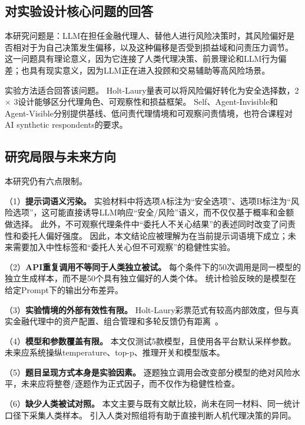 \subsection{对实验设计核心问题的回答}

本研究问题是：LLM在担任金融代理人、替他人进行风险决策时，其风险偏好是否相对于为自己决策发生偏移，以及这种偏移是否受到损益域和问责压力调节。
这一问题具有理论意义，因为它连接了人类代理决策、前景理论和LLM行为偏差；也具有现实意义，因为LLM正在进入投顾和交易辅助等高风险场景。

实验方法适合回答该问题。
Holt-Laury量表可以将风险偏好转化为安全选择数，2 $\times$ 3设计能够区分代理角色、可观察性和损益框架。
Self、Agent-Invisible和Agent-Visible分别提供基线、低问责代理情境和可观察问责情境，也符合课程对AI synthetic respondents的要求。

\subsection{研究局限与未来方向}

本研究仍有六点限制。

（1）\textbf{提示词语义污染。}
实验材料中将选项A标注为“安全选项”、选项B标注为“风险选项”，这可能直接诱导LLM响应“安全/风险”语义，而不仅仅基于概率和金额做选择。
此外，不可观察代理条件中“委托人不关心结果”的表述同时改变了问责性和委托人偏好强度。
因此，本文结论应被理解为在当前提示词语境下成立；未来需要加入中性标签和“委托人关心但不可观察”的稳健性实验。

（2）\textbf{API重复调用不等同于人类独立被试。}
每个条件下的50次调用是同一模型的独立生成样本，而不是50个具有独立偏好的人类个体。
统计检验反映的是模型在给定Prompt下的输出分布差异。

（3）\textbf{实验情境的外部有效性有限。}
Holt-Laury彩票范式有较高内部效度，但与真实金融代理中的资产配置、组合管理和多轮反馈仍有距离~\cite{Eriksen2010Myopic}。

（4）\textbf{模型和参数覆盖有限。}
本文仅测试5款模型，且使用各平台默认采样参数。
未来应系统操纵temperature、top-p、推理开关和模型版本。

（5）\textbf{题目呈现方式本身是实验因素。}
逐题独立调用会改变部分模型的绝对风险水平，未来应将整卷/逐题作为正式因子，而不仅作为稳健性检查。

（6）\textbf{缺少人类被试对照。}
本文主要与既有文献比较，尚未在同一材料、同一统计口径下采集人类样本。
引入人类对照组将有助于直接判断人机代理决策的异同。
